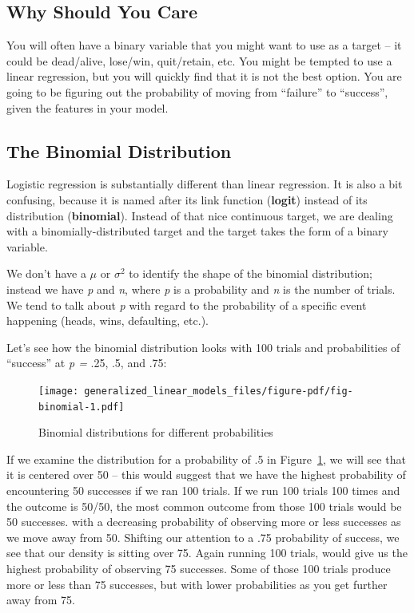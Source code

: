 \documentclass[
  letterpaper,
]{krantz}
\begin{document}
\subsection{Why Should You Care}\label{sec-glm-logistic-why}

You will often have a binary variable that you might want to use as a
target -- it could be dead/alive, lose/win, quit/retain, etc. You might
be tempted to use a linear regression, but you will quickly find that it
is not the best option. You are going to be figuring out the probability
of moving from ``failure'' to ``success'', given the features in your
model.

\subsection{The Binomial Distribution}\label{sec-glm-binomial}

Logistic regression is substantially different than linear regression.
It is also a bit confusing, because it is named after its link function
(\textbf{logit}) instead of its distribution (\textbf{binomial}).
Instead of that nice continuous target, we are dealing with a
binomially-distributed target and the target takes the form of a binary
variable.

We don't have a \(\mu\) or \(\sigma^2\) to identify the shape of the
binomial distribution; instead we have \emph{p} and \emph{n}, where
\emph{p} is a probability and \emph{n} is the number of trials. We tend
to talk about \emph{p} with regard to the probability of a specific
event happening (heads, wins, defaulting, etc.).

Let's see how the binomial distribution looks with 100 trials and
probabilities of ``success'' at \emph{p = } .25, .5, and .75:

\begin{figure}

{\centering \texttt{[image: generalized\_linear\_models\_files/figure-pdf/fig-binomial-1.pdf]}

}

\caption{\label{fig-binomial}Binomial distributions for different
probabilities}

\end{figure}

If we examine the distribution for a probability of .5 in
Figure~\ref{fig-binomial}, we will see that it is centered over 50 --
this would suggest that we have the highest probability of encountering
50 successes if we ran 100 trials. If we run 100 trials 100 times and
the outcome is 50/50, the most common outcome from those 100 trials
would be 50 successes. with a decreasing probability of observing more
or less successes as we move away from 50. Shifting our attention to a
.75 probability of success, we see that our density is sitting over 75.
Again running 100 trials, would give us the highest probability of
observing 75 successes. Some of those 100 trials produce more or less
than 75 successes, but with lower probabilities as you get further away
from 75.
\end{document}
